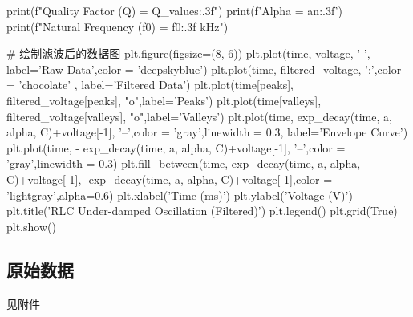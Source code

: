 \documentclass[UTF8]{ctexart}
\begin{document}
\begin{python}
print(f"Quality Factor (Q) = {Q_values:.3f}")
print(f'Alpha = {an:.3f}')
print(f"Natural Frequency (f0) = {f0:.3f} kHz")


# 绘制滤波后的数据图
plt.figure(figsize=(8, 6))
plt.plot(time, voltage, '-', label='Raw Data',color = 'deepskyblue')
plt.plot(time, filtered_voltage, ':',color = 'chocolate' , label='Filtered Data')
plt.plot(time[peaks], filtered_voltage[peaks], "o",label='Peaks')
plt.plot(time[valleys], filtered_voltage[valleys], "o",label='Valleys')
plt.plot(time, exp_decay(time, a, alpha, C)+voltage[-1], '--',color = 'gray',linewidth = 0.3, label='Envelope Curve')
plt.plot(time, - exp_decay(time, a, alpha, C)+voltage[-1], '--',color = 'gray',linewidth = 0.3)
plt.fill_between(time, exp_decay(time, a, alpha, C)+voltage[-1],- exp_decay(time, a, alpha, C)+voltage[-1],color = 'lightgray',alpha=0.6)
plt.xlabel('Time (ms)')
plt.ylabel('Voltage (V)')
plt.title('RLC Under-damped Oscillation (Filtered)')
plt.legend()
plt.grid(True)
plt.show()




\end{python}
\subsection{原始数据}
见附件

\end{document}
